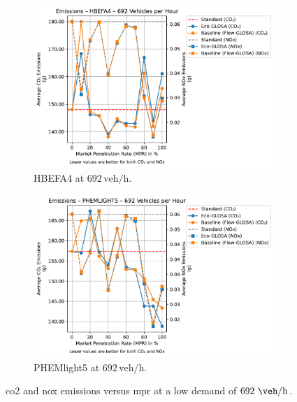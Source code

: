 \begin{figure}[htb]
  \centering
  \begin{subfigure}[b]{0.45\textwidth}
    \includegraphics[width=\textwidth]{data/img/Emissions/Emissions_HBEFA4_Cars692.pdf}
    \caption{HBEFA4 at $692\,\mathrm{veh/h}$.}
    \label{fig:Emis_692_HBEFA4}
  \end{subfigure}\hfill
  \begin{subfigure}[b]{0.45\textwidth}
    \includegraphics[width=\textwidth]{data/img/Emissions/Emissions_PHEMLIGHT5_Cars692.pdf}
    \caption{PHEMlight5 at $692\,\mathrm{veh/h}$.}
    \label{fig:Emis_692_PHEM}
  \end{subfigure}
  \caption[\ac{co2} and \ac{nox} emissions vs. \ac{mpr} at $692~\unit{\veh\per\hour}$]{\ac{co2} and \ac{nox} emissions versus \ac{mpr} at a low demand of $692~\unit{\veh\per\hour}$.}
\label{fig:Emis_692}
\end{figure}


